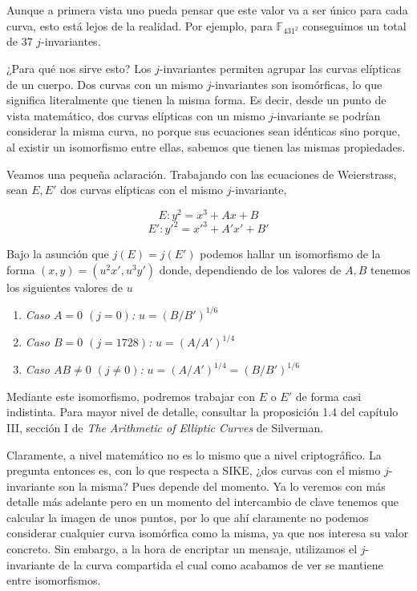 Aunque a primera vista uno pueda pensar que este valor va a ser único para cada curva, esto está lejos de la realidad. Por ejemplo, para $\mathbb{F}_{431^2}$ conseguimos un total de $37$ $j$-invariantes.

¿Para qué nos sirve esto? Los $j$-invariantes permiten agrupar las curvas elípticas de un cuerpo. Dos curvas con un mismo $j$-invariantes son isomórficas, lo que significa literalmente que tienen la misma forma. Es decir, desde un punto de vista matemático, dos curvas elípticas con un mismo $j$-invariante se podrían considerar la misma curva, no porque sus ecuaciones sean idénticas sino porque, al existir un isomorfismo entre ellas, sabemos que tienen las mismas propiedades.

Veamos una pequeña aclaración. Trabajando con las ecuaciones de Weierstrass, sean $E,E'$ dos curvas elípticas con el mismo $j$-invariante,

\[ E: y^2 = x^3 + Ax + B \]
\[ E' : y'^2 = x'^3 + A'x' + B' \]

Bajo la asunción que $j(E) = j(E')$ podemos hallar un isomorfismo de la forma $(x,y) = (u^2x', u^3y')$ donde, dependiendo de los valores de $A,B$ tenemos los siguientes valores de $u$

\begin{enumerate}
    \item \textit{Caso $A=0$ $(j=0)$: } $u=(B/B')^{1/6}$
    \item \textit{Caso $B=0$ $(j=1728)$: } $u=(A/A')^{1/4}$
    \item \textit{Caso $AB\neq0$ $(j\neq0)$: } $u=(A/A')^{1/4}=(B/B')^{1/6}$
\end{enumerate}

Mediante este isomorfismo, podremos trabajar con $E$ o $E'$ de forma casi indistinta. Para mayor nivel de detalle, consultar la proposición 1.4 del capítulo III, sección I de \textit{The Arithmetic of Elliptic Curves} de Silverman.

Claramente, a nivel matemático no es lo mismo que a nivel criptográfico. La pregunta entonces es, con lo que respecta a SIKE, ¿dos curvas con el mismo $j$-invariante son la misma? Pues depende del momento. Ya lo veremos con más detalle más adelante pero en un momento del intercambio de clave tenemos que calcular la imagen de unos puntos, por lo que ahí claramente no podemos considerar cualquier curva isomórfica como la misma, ya que nos interesa su valor concreto. Sin embargo, a la hora de encriptar un mensaje, utilizamos el $j$-invariante de la curva compartida el cual como acabamos de ver se mantiene entre isomorfismos.


